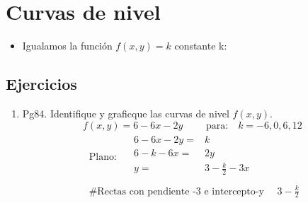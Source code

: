 


\section{Curvas de nivel}
\begin{itemize}
    \item Igualamos la función $f(x,y) = k$ constante k:
\end{itemize}



\subsection{Ejercicios}
\begin{enumerate}
    \item Pg84. Identifique y graficque las curvas de nivel $f(x,y)$.
    \newline \[
      f(x,y) = 6-6x-2y \quad \quad \text{  para:} \quad k=-6,0,6,12 
    \]
    \begin{align*}
        \text{  Plano:  } \quad \begin{matrix}
            6-6x-2y=&k \\ 
            6-k-6x=&2y \\
            y =& 3- \frac{k}{2} -3x \\ 
        \end{matrix} \\ 
        \text{  \# Rectas con pendiente -3 e intercepto-y   } \quad 3-\frac{k}{2} \\ 
    \end{align*}
\end{enumerate}































    

